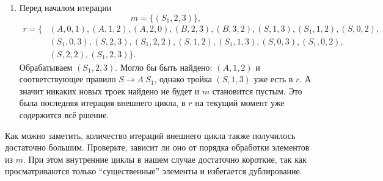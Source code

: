 \begin{example}
\begin{enumerate}
   \item
   Перед началом итерации
     $$
     m = \{(S_1, 2, 3)\},
     $$
     \begin{align*}
     r= \{&(A,0,1),(A,1,2),(A,2,0),(B,2,3),(B,3,2),(S,1,3),(S_1, 1, 2),(S, 0, 2),\\
          &(S_1, 0, 3),(S, 2, 3),(S_1, 2, 2),(S, 1, 2),(S_1, 1, 3),(S, 0, 3),(S_1, 0, 2),\\
          &(S, 2, 2),(S_1, 2, 3)\}.
     \end{align*}
     Обрабатываем $(S_1, 2, 3)$.
     Могло бы быть найдено: $(A,1,2)$ и соответствующее правило $S \to A \ S_1$, однако тройка $(S, 1, 3)$ уже есть в $r$.
     А значит никаких новых троек найдено не будет и $m$ становится пустым.
     Это была последняя итерация внешнего цикла, в $r$ на текущий момент уже содержится всё ршение.

  \end{enumerate}

\end{example}

Как можно заметить, количество итераций внешнего цикла также получилось достаточно большим.
Проверьте, зависит ли оно от порядка обработки элементов из $m$.
При этом внутренние циклы в нашем случае достаточно короткие, так как просматриваются только ``существенные'' элементы и избегается дублирование.

